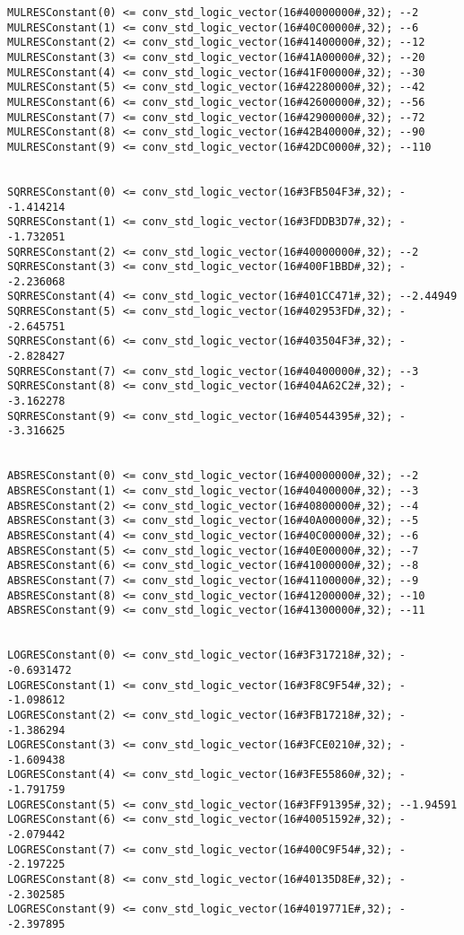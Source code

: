 \documentclass[conference]{IEEEtran}
\begin{document}
\begin{lstlisting}
MULRESConstant(0) <= conv_std_logic_vector(16#40000000#,32); --2
MULRESConstant(1) <= conv_std_logic_vector(16#40C00000#,32); --6
MULRESConstant(2) <= conv_std_logic_vector(16#41400000#,32); --12
MULRESConstant(3) <= conv_std_logic_vector(16#41A00000#,32); --20
MULRESConstant(4) <= conv_std_logic_vector(16#41F00000#,32); --30
MULRESConstant(5) <= conv_std_logic_vector(16#42280000#,32); --42
MULRESConstant(6) <= conv_std_logic_vector(16#42600000#,32); --56
MULRESConstant(7) <= conv_std_logic_vector(16#42900000#,32); --72
MULRESConstant(8) <= conv_std_logic_vector(16#42B40000#,32); --90
MULRESConstant(9) <= conv_std_logic_vector(16#42DC0000#,32); --110


SQRRESConstant(0) <= conv_std_logic_vector(16#3FB504F3#,32); --1.414214
SQRRESConstant(1) <= conv_std_logic_vector(16#3FDDB3D7#,32); --1.732051
SQRRESConstant(2) <= conv_std_logic_vector(16#40000000#,32); --2
SQRRESConstant(3) <= conv_std_logic_vector(16#400F1BBD#,32); --2.236068
SQRRESConstant(4) <= conv_std_logic_vector(16#401CC471#,32); --2.44949
SQRRESConstant(5) <= conv_std_logic_vector(16#402953FD#,32); --2.645751
SQRRESConstant(6) <= conv_std_logic_vector(16#403504F3#,32); --2.828427
SQRRESConstant(7) <= conv_std_logic_vector(16#40400000#,32); --3
SQRRESConstant(8) <= conv_std_logic_vector(16#404A62C2#,32); --3.162278
SQRRESConstant(9) <= conv_std_logic_vector(16#40544395#,32); --3.316625


ABSRESConstant(0) <= conv_std_logic_vector(16#40000000#,32); --2
ABSRESConstant(1) <= conv_std_logic_vector(16#40400000#,32); --3
ABSRESConstant(2) <= conv_std_logic_vector(16#40800000#,32); --4
ABSRESConstant(3) <= conv_std_logic_vector(16#40A00000#,32); --5
ABSRESConstant(4) <= conv_std_logic_vector(16#40C00000#,32); --6
ABSRESConstant(5) <= conv_std_logic_vector(16#40E00000#,32); --7
ABSRESConstant(6) <= conv_std_logic_vector(16#41000000#,32); --8
ABSRESConstant(7) <= conv_std_logic_vector(16#41100000#,32); --9
ABSRESConstant(8) <= conv_std_logic_vector(16#41200000#,32); --10
ABSRESConstant(9) <= conv_std_logic_vector(16#41300000#,32); --11


LOGRESConstant(0) <= conv_std_logic_vector(16#3F317218#,32); --0.6931472
LOGRESConstant(1) <= conv_std_logic_vector(16#3F8C9F54#,32); --1.098612
LOGRESConstant(2) <= conv_std_logic_vector(16#3FB17218#,32); --1.386294
LOGRESConstant(3) <= conv_std_logic_vector(16#3FCE0210#,32); --1.609438
LOGRESConstant(4) <= conv_std_logic_vector(16#3FE55860#,32); --1.791759
LOGRESConstant(5) <= conv_std_logic_vector(16#3FF91395#,32); --1.94591
LOGRESConstant(6) <= conv_std_logic_vector(16#40051592#,32); --2.079442
LOGRESConstant(7) <= conv_std_logic_vector(16#400C9F54#,32); --2.197225
LOGRESConstant(8) <= conv_std_logic_vector(16#40135D8E#,32); --2.302585
LOGRESConstant(9) <= conv_std_logic_vector(16#4019771E#,32); --2.397895



\end{lstlisting}
\end{document}
